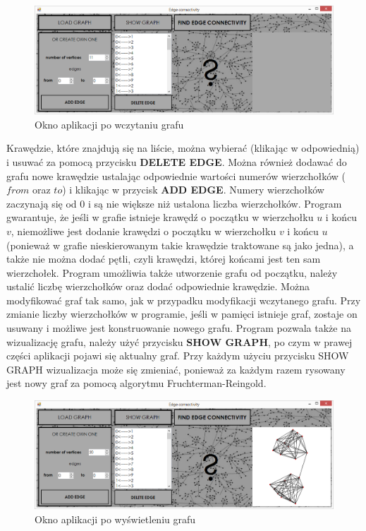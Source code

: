 \documentclass{article}
\begin{document}
\begin{figure}[H]
\centering
\includegraphics[scale=0.4]{02}
\caption{Okno aplikacji po wczytaniu grafu}
\end{figure}

Krawędzie, które znajdują się na liście, można wybierać (klikając w odpowiednią) i usuwać za pomocą przycisku \textbf{DELETE EDGE}. Można również dodawać do grafu nowe krawędzie ustalając odpowiednie wartości numerów wierzchołków ($from$ oraz $to$) i klikając w przycisk \textbf{ADD EDGE}. Numery wierzchołków zaczynają się od 0 i są nie większe niż ustalona liczba wierzchołków. Program gwarantuje, że jeśli w grafie istnieje krawędź o początku w wierzchołku $u$ i końcu $v$, niemożliwe jest dodanie krawędzi o początku w wierzchołku $v$ i końcu $u$ (ponieważ w grafie nieskierowanym takie krawędzie traktowane są jako jedna), a także nie można dodać pętli, czyli krawędzi, której końcami jest ten sam wierzchołek.
Program umożliwia także utworzenie grafu od początku, należy ustalić liczbę wierzchołków oraz dodać odpowiednie krawędzie. Można modyfikować graf tak samo, jak w przypadku modyfikacji wczytanego grafu.
Przy zmianie liczby wierzchołków w programie, jeśli w pamięci istnieje graf, zostaje on usuwany i możliwe jest konstruowanie nowego grafu.
Program pozwala także na wizualizację grafu, należy użyć przycisku \textbf{SHOW GRAPH}, po czym w prawej części aplikacji pojawi się aktualny graf. Przy każdym użyciu przycisku SHOW GRAPH wizualizacja może się zmieniać, ponieważ za każdym razem rysowany jest nowy graf za pomocą algorytmu Fruchterman-Reingold.
 
\begin{figure}[H]
\centering
\includegraphics[scale=0.4]{03}
\caption{Okno aplikacji po wyświetleniu grafu}
\end{figure}
 
\end{document}
